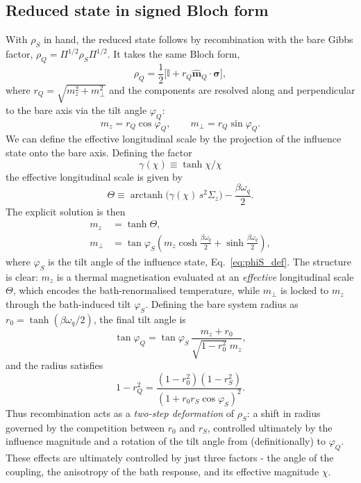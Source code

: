 \subsection{Reduced state in signed Bloch form}
\label{subsec:qubit_v3_reduced_state}
With \(\rho_S\) in hand, the reduced state follows by recombination with the bare Gibbs factor,
\(\rho_Q = \Pi^{1/2}\rho_S\Pi^{1/2}\). It takes the same Bloch form,
\begin{equation}
    \rho_Q = \frac{1}{2}\big[\mathbb I + r_Q \hat{\mathbf m}_Q \cdot \boldsymbol{\sigma}\big],
\end{equation}
where \(r_Q = \sqrt{m_z^2+m_\perp^2}\) and the components are resolved along and perpendicular to the
bare axis via the tilt angle \(\varphi_Q\):
\begin{equation}
    m_z = r_Q\cos\varphi_Q, \qquad m_\perp = r_Q\sin\varphi_Q.
    \label{eq:tilt_angle_def}
\end{equation}
We can define the effective longitudinal scale by the projection of the influence state onto the bare axis. Defining the factor
\begin{equation}
    \gamma(\chi)\equiv\tanh\chi/\chi
\end{equation}
the effective longitudinal scale is given by
\begin{equation}
    \Theta \equiv \operatorname{arctanh}\!\big(\gamma(\chi)\,s^2\Sigma_z\big)-\frac{\beta\omega_q}{2}.
    \label{eq:theta_param}
\end{equation}
The explicit solution is then
\begin{align}
    m_z &= \tanh\Theta, \label{eq:m_z_solution}\\
    m_\perp &= \tan\varphi_S\!\left(
        m_z\cosh\frac{\beta\omega_q}{2}
        +\sinh\frac{\beta\omega_q}{2}\right),
    \label{eq:bloch_locking_linear}
\end{align}
where \(\varphi_S\) is the tilt angle of the influence state, Eq.~\eqref{eq:phiS_def}.
The structure is clear: \(m_z\) is a thermal magnetisation evaluated at an
\emph{effective} longitudinal scale \(\Theta\), which encodes the bath-renormalised temperature, while
\(m_\perp\) is locked to \(m_z\) through the bath-induced tilt \(\varphi_S\). Defining the bare
system radius as \(r_0=\tanh(\beta\omega_q/2)\), the final tilt angle is
\begin{equation}
    \tan\varphi_Q = \tan\varphi_S\,\frac{m_z + r_0}{\sqrt{1-r_0^2}\;m_z},
    \label{eq:phiQ_def}
\end{equation}
and the radius satisfies
\begin{equation}
    1 - r_Q^2 = \frac{(1-r_0^2)(1-r_S^2)}{(1+r_0 r_S\cos\varphi_S)^2}.
    \label{eq:rQ_geometric_composition}
\end{equation}
Thus recombination acts as a \emph{two-step deformation} of \(\rho_S\): a shift in radius governed
by the competition between \(r_0\) and \(r_S\), controlled ultimately by the influence magnitude and a rotation of the tilt angle from  (definitionally) to \(\varphi_Q\). These effects are ultimately controlled by just three factors - the angle of the coupling, the anisotropy of the bath response, and its effective magnitude \(\chi\).

